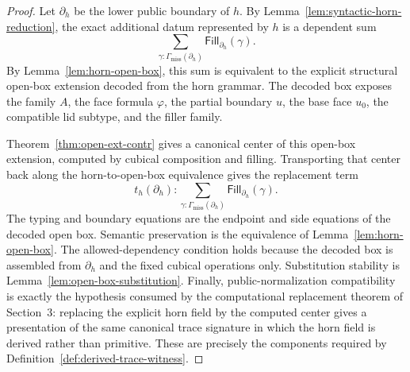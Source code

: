 \documentclass{lmcs}
\begin{document}
\begin{proof}
Let \(\partial_h\) be the lower public boundary of \(h\).  By
Lemma~\ref{lem:syntactic-horn-reduction}, the exact additional datum represented by \(h\) is
a dependent sum
\[
  \sum_{\gamma:\Gamma_{\mathrm{miss}}(\partial_h)}
    \mathsf{Fill}_{\partial_h}(\gamma).
\]
By Lemma~\ref{lem:horn-open-box}, this sum is equivalent to the explicit structural
open-box extension decoded from the horn grammar.  The decoded box exposes the family
\(A\), the face formula \(\varphi\), the partial boundary \(u\), the base face \(u_0\), the
compatible lid subtype, and the filler family.

Theorem~\ref{thm:open-ext-contr} gives a canonical center of this open-box extension,
computed by cubical composition and filling.  Transporting that center back along the
horn-to-open-box equivalence gives the replacement term
\[
  t_h(\partial_h)
  :
  \sum_{\gamma:\Gamma_{\mathrm{miss}}(\partial_h)}
    \mathsf{Fill}_{\partial_h}(\gamma).
\]
The typing and boundary equations are the endpoint and side equations of the decoded
open box.  Semantic preservation is the equivalence of
Lemma~\ref{lem:horn-open-box}.  The allowed-dependency condition holds because the decoded
box is assembled from \(\partial_h\) and the fixed cubical operations only.  Substitution
stability is Lemma~\ref{lem:open-box-substitution}.  Finally, public-normalization
compatibility is exactly the hypothesis consumed by the computational replacement theorem of
Section~3: replacing the explicit horn field by the computed center gives a presentation of
the same canonical trace signature in which the horn field is derived rather than primitive.
These are precisely the components required by
Definition~\ref{def:derived-trace-witness}.
\end{proof}
\end{document}
